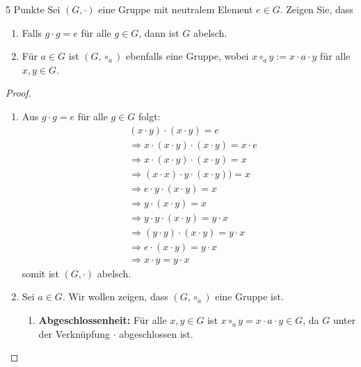 \documentclass{../problemset}
\begin{document}
\begin{problem} {5 Punkte}
Sei $(G, \cdot)$ eine Gruppe mit neutralem Element $e \in G$. Zeigen Sie, dass
\begin{enumerate}
	\item Falls $g \cdot g = e$ für alle $g \in G$, dann ist $G$ abelsch.
	\item Für $a \in G$ ist $(G, \circ_a)$ ebenfalls eine Gruppe, wobei $x \circ_a y := x \cdot a \cdot y$ für alle $x, y \in G$.
\end{enumerate}
\begin{proof}
	$ $

	\begin{enumerate}
		\item Aus $g \cdot g = e$ für alle $g \in G$ folgt: \begin{align*}
			       & (x \cdot y) \cdot (x \cdot y) = e \tag{$x \cdot y \in G \Longrightarrow \exists g \in G: g \cdot g = e$} \\
			       & \Longrightarrow x \cdot (x \cdot y) \cdot (x \cdot y) = x \cdot e                                        \\
			       & \Longrightarrow x \cdot (x \cdot y) \cdot (x \cdot y) = x                                                \\
			       & \Longrightarrow (x \cdot x) \cdot y \cdot (x \cdot y)) = x                                               \\
			       & \Longrightarrow e \cdot y \cdot (x \cdot y) = x                                                          \\
			       & \Longrightarrow y \cdot (x \cdot y) = x                                                                  \\
			       & \Longrightarrow y \cdot y \cdot (x \cdot y) = y \cdot x                                                  \\
			       & \Longrightarrow (y \cdot y) \cdot (x \cdot y) = y \cdot x                                                \\
			       & \Longrightarrow e \cdot (x \cdot y) = y \cdot x                                                          \\
			       & \Longrightarrow x \cdot y = y \cdot x
		      \end{align*}
		      somit ist $(G, \cdot)$ abelsch. \checkmark

		\item Sei $a \in G$. Wir wollen zeigen, dass $(G, \circ_a)$ eine Gruppe ist.
		      \begin{enumerate}
			      \item \textbf{Abgeschlossenheit:} Für alle $x, y \in G$ ist $x \circ_a y = x \cdot a \cdot y \in G$, da $G$ unter der Verknüpfung $\cdot$ abgeschlossen ist.


\end{enumerate}
\end{enumerate}
\end{proof}
\end{problem}
\end{document}
